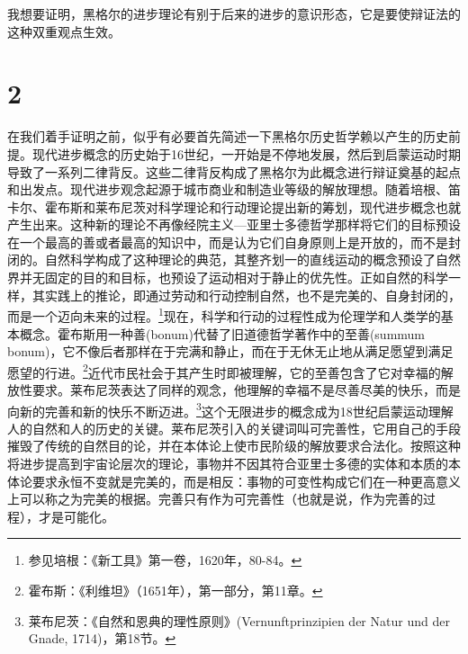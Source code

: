 我想要证明，黑格尔的进步理论有别于后来的进步的意识形态，它是要使辩证法的这种双重观点生效。

\section*{2}

在我们着手证明之前，似乎有必要首先简述一下黑格尔历史哲学赖以产生的历史前提。现代进步概念的历史始于16世纪，一开始是不停地发展，然后到启蒙运动时期导致了一系列二律背反。这些二律背反构成了黑格尔为此概念进行辩证奠基的起点和出发点。现代进步观念起源于城市商业和制造业等级的解放理想。随着培根、笛卡尔、霍布斯和莱布尼茨对科学理论和行动理论提出新的筹划，现代进步概念也就产生出来。这种新的理论不再像经院主义—亚里士多德哲学那样将它们的目标预设在一个最高的善或者最高的知识中，而是认为它们自身原则上是开放的，而不是封闭的。自然科学构成了这种理论的典范，其整齐划一的直线运动的概念预设了自然界并无固定的目的和目标，也预设了运动相对于静止的优先性。正如自然的科学一样，其实践上的推论，即通过劳动和行动控制自然，也不是完美的、自身封闭的，而是一个迈向未来的过程。\footnote{参见培根：《新工具》第一卷，1620年，80-84。}现在，科学和行动的过程性成为伦理学和人类学的基本概念。霍布斯用一种善(bonum)代替了旧道德哲学著作中的至善(summum bonum)，它不像后者那样在于完满和静止，而在于无休无止地从满足愿望到满足愿望的行进。\footnote{霍布斯：《利维坦》（1651年），第一部分，第11章。}近代市民社会于其产生时即被理解，它的至善包含了它对幸福的解放性要求。莱布尼茨表达了同样的观念，他理解的幸福不是尽善尽美的快乐，而是向新的完善和新的快乐不断迈进。\footnote{莱布尼茨：《自然和恩典的理性原则》(Vernunftprinzipien der Natur und der Gnade, 1714)，第18节。}这个无限进步的概念成为18世纪启蒙运动理解人的自然和人的历史的关键。莱布尼茨引入的关键词叫可完善性，它用自己的手段摧毁了传统的自然目的论，并在本体论上使市民阶级的解放要求合法化。按照这种将进步提高到宇宙论层次的理论，事物并不因其符合亚里士多德的实体和本质的本体论要求永恒不变就是完美的，而是相反：事物的可变性构成它们在一种更高意义上可以称之为完美的根据。完善只有作为可完善性（也就是说，作为完善的过程），才是可能化。

